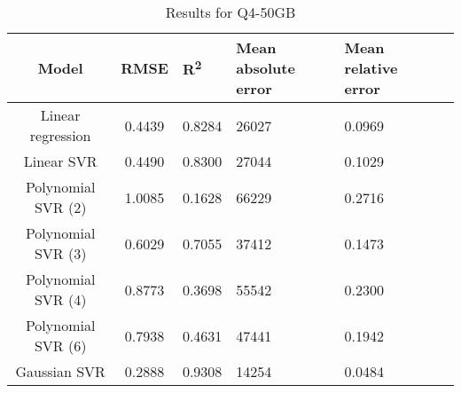 \begin{table}[H]
\centering
\begin{adjustbox}{center}
\begin{tabular}{c | c M{1.2cm} M{2.5cm} M{2.5cm} M{1.8cm}}
Model & RMSE & R\textsuperscript{2} & Mean absolute error & Mean relative error \tabularnewline
\hline
Linear regression & 0.4439 & 0.8284 &  26027 & 0.0969 \\
Linear SVR & 0.4490 & 0.8300 &  27044 & 0.1029 \\
Polynomial SVR (2) & 1.0085 & 0.1628 &  66229 & 0.2716 \\
Polynomial SVR (3) & 0.6029 & 0.7055 &  37412 & 0.1473 \\
Polynomial SVR (4) & 0.8773 & 0.3698 &  55542 & 0.2300 \\
Polynomial SVR (6) & 0.7938 & 0.4631 &  47441 & 0.1942 \\
Gaussian SVR & 0.2888 & 0.9308 &  14254 & 0.0484 \\
\end{tabular}
\end{adjustbox}
\\
\caption{Results for Q4-50GB}
\label{tab:all_linear_Q4_50}
\end{table}
